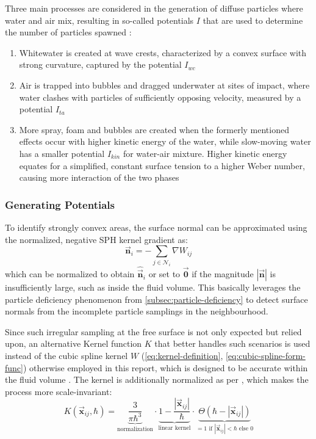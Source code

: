 \documentclass[oneside, a4paper]{book}
\newcounter{phase}[algorithm]
\newcommand\abs[1]{\left|#1\right|}
\newcommand\vek[1]{\vec{\bm{#1}}}
\newcommand\br[1]{\left(#1\right)}
\begin{document}
  Three main processes are considered in the generation of diffuse particles where water and air mix, resulting in so-called potentials $I$ that are used to determine the number of particles spawned \autocite{spray-foam-bubbles}:
  \begin{enumerate}
    \item Whitewater is created at wave crests, characterized by a convex surface with strong curvature, captured by the potential $I_{wc}$
    \item Air is trapped into bubbles and dragged underwater at sites of impact, where water clashes with particles of sufficiently opposing velocity, measured by a potential $I_{ta}$
    \item More spray, foam and bubbles are created when the formerly mentioned effects occur with higher kinetic energy of the water, while slow-moving water has a smaller potential $I_{kin}$ for water-air mixture. Higher kinetic energy equates for a simplified, constant surface tension to a higher Weber number, causing more interaction of the two phases \autocite{spray-foam-bubbles}
  \end{enumerate}

  \subsubsection{Generating Potentials}
  To identify strongly convex areas, the surface normal can be approximated using the  normalized, negative SPH kernel gradient as:
  \begin{equation}
    \vek{n}_i = - \sum_{j\in\mathcal{N}_i} \nabla W_{ij}
  \end{equation}
  which can be normalized to obtain $\hat{\vek{n}}_i$ or set to $\vek{0}$ if the magnitude $\abs{\vek{n}}$ is insufficiently large, such as inside the fluid volume. This basically leverages the particle deficiency phenomenon from \autoref{subsec:particle-deficiency} to detect surface normals from the incomplete particle samplings in the neighbourhood. 

  Since such irregular sampling at the free surface is not only expected but relied upon, an alternative Kernel function $K$ that better handles such scenarios is used instead of the cubic spline kernel $W$ (\autoref{eq:kernel-definition}, \autoref{eq:cubic-spline-form-func}) otherwise employed in this report, which is designed to be accurate within the fluid volume \autocite{spray-foam-bubbles}. The kernel is additionally normalized as per \autocite[later suggestions]{turbulent-micropolar-foam}, which makes the process more scale-invariant:
  \begin{equation}\label{eq:k-kernel-def}
    K\br{\vek{x}_{ij}, \hbar} = 
    \underbrace{ \frac{3}{\pi\hbar^3}}_{\text{normalization}} \cdot 
    \underbrace{1-\frac{\abs{\vek{x}_{ij}}}{\hbar}}_{\text{linear kernel}} \cdot 
   \underbrace{ \Theta\br{\hbar-\abs{\vek{x}_{ij}}}}_{= 1 \text{ if } \abs{\vek{x}_{ij}}<\hbar \text{ else } 0}
  \end{equation}
\end{document}
